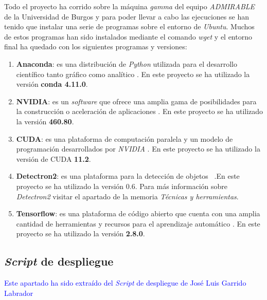 Todo el proyecto ha corrido sobre la máquina \textit{gamma} del equipo \textit{ADMIRABLE} de la Universidad de Burgos y para poder llevar a cabo las ejecuciones se han tenido que instalar una serie de programas sobre el entorno de \textit{Ubuntu}.
Muchos de estos programas han sido instalados mediante el comando \textit{wget} y el entorno final ha quedado con los siguientes programas y versiones:
\begin{enumerate}
    \item \textbf{Anaconda}: es una distribución de \textit{Python} utilizada para el desarrollo científico tanto gráfico como analítico \cite{wiki:anaconda}. En este proyecto se ha utilizado la versión \textbf{conda 4.11.0}.
    \item \textbf{NVIDIA}: es un \textit{software} que ofrece una amplia gama de posibilidades para la construcción o aceleración de aplicaciones \cite{wiki:nvidia}. En este proyecto se ha utilizado la versión \textbf{460.80}.
    \item \textbf{CUDA}: es una plataforma de computación paralela  y un modelo de programación desarrollados por \textit{NVIDIA} \cite{wiki:cuda}. En este proyecto se ha utilizado la versión de CUDA \textbf{ 11.2}.
    \item \textbf{Detectron2}: es una plataforma para la detección de objetos ~\cite{wu2019detectron2}.En este proyecto se ha utilizado la versión 0.6. Para más información sobre \textit{Detectron2} visitar el apartado de la memoria \textit{Técnicas y herramientas}.
    \item \textbf{Tensorflow}: es una plataforma de código abierto que cuenta con una amplia cantidad de herramientas y recursos para el aprendizaje automático \cite{wiki:tensorflow}. En este proyecto se ha utilizado la versión \textbf{2.8.0}.
\end{enumerate}


\subsection{\textit{Script} de despliegue}
\textcolor{blue}{Este apartado ha sido extraído del \textit{Script} de despliegue de José Luis Garrido Labrador}

